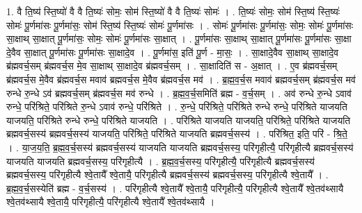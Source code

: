 \documentclass[17pt]{extarticle}
\begin{document}
1. वै ति॒ष्य॑ स्ति॒ष्यो॑ वै वै ति॒ष्यः॑ सोमः॒ सोम॑ स्ति॒ष्यो॑ वै वै ति॒ष्यः॑ सोमः॑ । . ति॒ष्यः॑ सोमः॒ सोम॑ स्ति॒ष्य॑ स्ति॒ष्यः॑ सोमः॑ पू॒र्णमा॑सः पू॒र्णमा॑सः॒ सोम॑ स्ति॒ष्य॑ स्ति॒ष्यः॑ सोमः॑ पू॒र्णमा॑सः । . सोमः॑ पू॒र्णमा॑सः पू॒र्णमा॑सः॒ सोमः॒ सोमः॑ पू॒र्णमा॑सः सा॒क्षाथ् सा॒क्षात् पू॒र्णमा॑सः॒ सोमः॒ सोमः॑ पू॒र्णमा॑सः सा॒क्षात् । . पू॒र्णमा॑सः सा॒क्षाथ् सा॒क्षात् पू॒र्णमा॑सः पू॒र्णमा॑सः सा॒क्षा दे॒वैव सा॒क्षात् पू॒र्णमा॑सः पू॒र्णमा॑सः सा॒क्षादे॒व । . पू॒र्णमा॑स॒ इति॑ पू॒र्ण - मा॒सः॒ । . सा॒क्षादे॒वैव सा॒क्षाथ् सा॒क्षादे॒व ब्र॑ह्मवर्च॒सम् ब्र॑ह्मवर्च॒स मे॒व सा॒क्षाथ् सा॒क्षादे॒व ब्र॑ह्मवर्च॒सम् । . सा॒क्षादिति॑ स - अ॒क्षात् । . ए॒व ब्र॑ह्मवर्च॒सम् ब्र॑ह्मवर्च॒स मे॒वैव ब्र॑ह्मवर्च॒स मवाव॑ ब्रह्मवर्च॒स मे॒वैव ब्र॑ह्मवर्च॒स मव॑ । . ब्र॒ह्म॒व॒र्च॒स मवाव॑ ब्रह्मवर्च॒सम् ब्र॑ह्मवर्च॒स मव॑ रुन्धे रु॒न्धे ऽव॑ ब्रह्मवर्च॒सम् ब्र॑ह्मवर्च॒स मव॑ रुन्धे । . ब्र॒ह्म॒व॒र्च॒समिति॑ ब्रह्म - व॒र्च॒सम् । . अव॑ रुन्धे रु॒न्धे ऽवाव॑ रुन्धे॒ परि॑श्रिते॒ परि॑श्रिते रु॒न्धे ऽवाव॑ रुन्धे॒ परि॑श्रिते । . रु॒न्धे॒ परि॑श्रिते॒ परि॑श्रिते रुन्धे रुन्धे॒ परि॑श्रिते याजयति याजयति॒ परि॑श्रिते रुन्धे रुन्धे॒ परि॑श्रिते याजयति । . परि॑श्रिते याजयति याजयति॒ परि॑श्रिते॒ परि॑श्रिते याजयति ब्रह्मवर्च॒सस्य॑ ब्रह्मवर्च॒सस्य॑ याजयति॒ परि॑श्रिते॒ परि॑श्रिते याजयति ब्रह्मवर्च॒सस्य॑ । . परि॑श्रित॒ इति॒ परि॑ - श्रि॒ते॒ । . या॒ज॒य॒ति॒ ब्र॒ह्म॒व॒र्च॒सस्य॑ ब्रह्मवर्च॒सस्य॑ याजयति याजयति ब्रह्मवर्च॒सस्य॒ परि॑गृहीत्यै॒ परि॑गृहीत्यै ब्रह्मवर्च॒सस्य॑ याजयति याजयति ब्रह्मवर्च॒सस्य॒ परि॑गृहीत्यै । . ब्र॒ह्म॒व॒र्च॒सस्य॒ परि॑गृहीत्यै॒ परि॑गृहीत्यै ब्रह्मवर्च॒सस्य॑ ब्रह्मवर्च॒सस्य॒ परि॑गृहीत्यै श्वे॒तायै᳚ श्वे॒तायै॒ परि॑गृहीत्यै ब्रह्मवर्च॒सस्य॑ ब्रह्मवर्च॒सस्य॒ परि॑गृहीत्यै श्वे॒तायै᳚ । . ब्र॒ह्म॒व॒र्च॒सस्येति॑ ब्रह्म - व॒र्च॒सस्य॑ । . परि॑गृहीत्यै श्वे॒तायै᳚ श्वे॒तायै॒ परि॑गृहीत्यै॒ परि॑गृहीत्यै श्वे॒तायै᳚ श्वे॒तव॑थ्सायै श्वे॒तव॑थ्सायै श्वे॒तायै॒ परि॑गृहीत्यै॒ परि॑गृहीत्यै श्वे॒तायै᳚ श्वे॒तव॑थ्सायै । \newline
\end{document}
